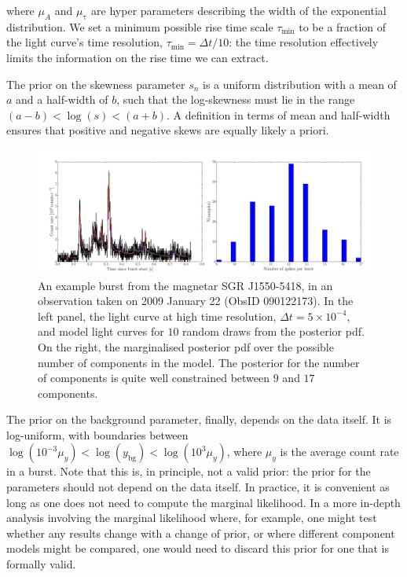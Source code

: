 \documentclass[12pt]{emulateapj}
\newcommand{\counts}{y}
\begin{document}
where $\mu_A$ and $\mu_{\mathrm{\tau}}$ are hyper parameters describing the width of the exponential distribution.
We set a minimum possible rise time scale $\tau_{\mathrm{min}}$ to be a fraction of the light curve's time resolution,
$\tau_{\mathrm{min}} = \Delta t/10$: the time resolution effectively limits the information on the rise time we can extract.

The prior on the skewness parameter $s_n$ is a uniform distribution with a mean of $a$ and a half-width of $b$, such
that the log-skewness must lie in the range $(a-b) < \log{(s)} < (a+b)$. A definition in terms of mean and half-width ensures
that positive and negative skews are equally likely a priori.

\begin{figure}[h]
\begin{center}
\includegraphics[width=\textwidth]{example_dnest_result.pdf}
\caption{An example burst from the magnetar SGR J1550-5418, in an observation taken on 2009 January 22 (ObsID 090122173). In the left
panel, the light curve at high time resolution, $\Delta t = 5 \times 10^{-4}$, and model light curves for $10$ random draws from the posterior pdf. 
On the right, the marginalised posterior pdf over the possible number of components in the model. The posterior for the number of components is 
quite well constrained between $9$ and $17$ components.}
\label{fig:dnest_example}
\end{center}
\end{figure}

The prior on the background parameter, finally, depends on the data itself. It is log-uniform, with boundaries between 
$\log{(10^{-3}\mu_\counts)} < \log{(\counts_{\mathrm{bg}})} < \log{(10^{3} \mu_\counts)}$, where $\mu_\counts$ is the average count
rate in a burst. Note that this is, in principle, not a valid prior: the prior for the parameters should not depend on the data
itself. In practice, it is convenient as long as one does not need to compute the marginal likelihood. In a more in-depth analysis
involving the marginal likelihood where, for example, one might test whether any results change with a change of prior, or where different component models
might be compared, one would need to discard this prior for one that is formally valid.
\end{document}
